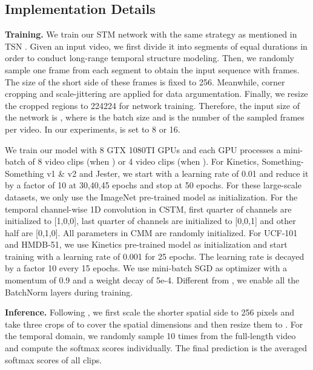 \documentclass[10pt,twocolumn,letterpaper]{article}
\begin{document}
	\subsection{Implementation Details}
	\textbf{Training.} We train our STM network with the same strategy as mentioned in TSN \cite{wang2016temporal}. Given an input video, we first divide it into  segments of equal durations in order to conduct long-range temporal structure modeling. Then, we randomly sample one frame from each segment to obtain the input sequence with  frames. The size of the short side of these frames is fixed to 256. Meanwhile,  corner cropping and scale-jittering are applied for data argumentation. Finally, we resize the cropped regions to 224224 for network training. Therefore, the input size of the network is , where  is the batch size and  is the number of the sampled frames per video. In our experiments,  is set to 8 or 16.

	
	We train our model with 8 GTX 1080TI GPUs and each GPU processes a mini-batch of 8 video clips (when ) or 4 video clips (when ). For Kinetics, Something-Something v1 \& v2 and Jester, we start with a learning rate of 0.01 and reduce it by a factor of 10 at 30,40,45 epochs and stop at 50 epochs. For these large-scale datasets, we only use the ImageNet pre-trained model as initialization. For the temporal channel-wise 1D convolution in CSTM, first quarter of channels are initialized to [1,0,0], last quarter of channels are initialized to [0,0,1] and other half are [0,1,0]. All parameters in CMM are randomly initialized. For UCF-101 and HMDB-51, we use Kinetics pre-trained model as initialization and start training with a learning rate of 0.001 for 25 epochs. The learning rate is decayed by a factor 10 every 15 epochs. We use mini-batch SGD as optimizer with a momentum of 0.9 and a weight decay of 5e-4. Different from \cite{wang2016temporal}, we enable all the BatchNorm layers \cite{ioffe2015batch} during training.
	
	
	\textbf{Inference.} Following \cite{wang2018non,feichtenhofer2018slowfast}, we first scale the shorter spatial side to 256 pixels and take three crops of  to cover the spatial dimensions and then resize them to . For the temporal domain, we randomly sample 10 times from the full-length video and compute the softmax scores individually. The final prediction is the averaged softmax scores of all clips.
	
	
\end{document}
